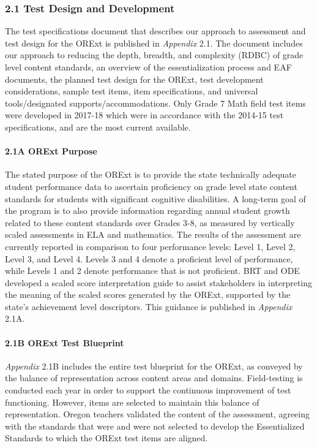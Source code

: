 \documentclass[]{article}
\let\oldparagraph\paragraph
\renewcommand{\paragraph}[1]{\oldparagraph{#1}\mbox{}}
\begin{document}
\subsubsection{2.1 Test Design and
Development}\label{test-design-and-development}

The test specifications document that describes our approach to
assessment and test design for the ORExt is published in \emph{Appendix}
2.1. The document includes our approach to reducing the depth, breadth,
and complexity (RDBC) of grade level content standards, an overview of
the essentialization process and EAF documents, the planned test design
for the ORExt, test development considerations, sample test items, item
specifications, and universal tools/designated supports/accommodations.
Only Grade 7 Math field test items were developed in 2017-18 which were
in accordance with the 2014-15 test specifications, and are the most
current available.

\paragraph{2.1A ORExt Purpose}\label{a-orext-purpose}

The stated purpose of the ORExt is to provide the state technically
adequate student performance data to ascertain proficiency on grade
level state content standards for students with significant cognitive
disabilities. A long-term goal of the program is to also provide
information regarding annual student growth related to these content
standards over Grades 3-8, as measured by vertically scaled assessments
in ELA and mathematics. The results of the assessment are currently
reported in comparison to four performance levels: Level 1, Level 2,
Level 3, and Level 4. Levels 3 and 4 denote a proficient level of
performance, while Levels 1 and 2 denote performance that is not
proficient. BRT and ODE developed a scaled score interpretation guide to
assist stakeholders in interpreting the meaning of the scaled scores
generated by the ORExt, supported by the state's achievement level
descriptors. This guidance is published in \emph{Appendix} 2.1A.

\paragraph{2.1B ORExt Test Blueprint}\label{b-orext-test-blueprint}

\emph{Appendix} 2.1B includes the entire test blueprint for the ORExt,
as conveyed by the balance of representation across content areas and
domains. Field-testing is conducted each year in order to support the
continuous improvement of test functioning. However, items are selected
to maintain this balance of representation. Oregon teachers validated
the content of the assessment, agreeing with the standards that were and
were not selected to develop the Essentialized Standards to which the
ORExt test items are aligned.
\end{document}
